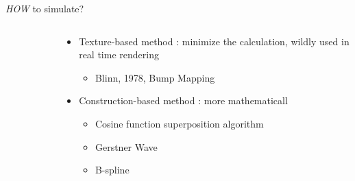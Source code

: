 \documentclass[handout,t]{beamer}
\begin{document}
\begin{frame}[t]{\emph{HOW} to simulate?}
\begin{columns}
\begin{column}{.48\textwidth}
\begin{figure}[thpb]
{        }
        \label{fig:system}
      \end{figure}
    \end{column}%
    \hfill%
    \begin{column}{.48\textwidth}
      \begin{itemize}
        \item Texture-based method : minimize the calculation, wildly used in real time rendering
          \begin{itemize}
            [ball]  
            \item Blinn, 1978, Bump Mapping
          \end{itemize}
        \item Construction-based method : more mathematicall
          \begin{itemize}
            [ball]  
            \item Cosine function superposition algorithm
            \item Gerstner Wave
            \item B-spline
          \end{itemize}
      \end{itemize}
    \end{column}%
  \end{columns}
\end{frame}
\end{document}
